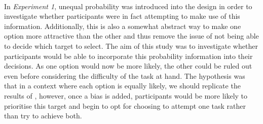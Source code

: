 \documentclass[12pt]{article}
\begin{document}
\paragraph{} In \textit{Experiment 1}, unequal probability was introduced into the design in order to investigate whether participants were in fact attempting to make use of this information. Additionally, this is also a somewhat abstract way to make one option more attractive than the other and thus remove the issue of not being able to decide which target to select. The aim of this study was to investigate whether participants would be able to incorporate this probability information into their decisions. As one option would now be more likely, the other could be ruled out even before considering the difficulty of the task at hand. The hypothesis was that in a context where each option is equally likely, we should replicate the results of \cite{clarke2015failure}, however, once a bias is added, participants would be more likely to prioritise this target and begin to opt for choosing to attempt one task rather than try to achieve both.  %



\end{document}
